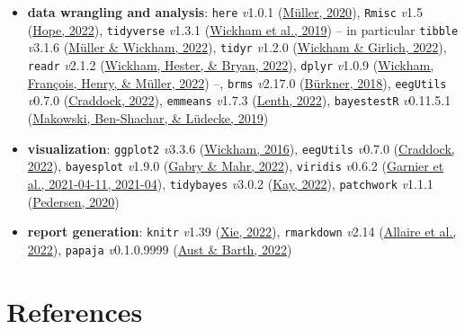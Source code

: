 \documentclass[
  man,floatsintext]{apa6}
\begin{document}
\begin{itemize}
\item
  \textbf{data wrangling and analysis}: \texttt{here} \emph{v}1.0.1 (\protect\hyperlink{ref-here}{Müller, 2020}), \texttt{Rmisc} \emph{v}1.5 (\protect\hyperlink{ref-Rmisc}{Hope, 2022}), \texttt{tidyverse} \emph{v}1.3.1 (\protect\hyperlink{ref-tidyverse}{Wickham et al., 2019}) -- in particular \texttt{tibble} \emph{v}3.1.6 (\protect\hyperlink{ref-tibble}{Müller \& Wickham, 2022}), \texttt{tidyr} \emph{v}1.2.0 (\protect\hyperlink{ref-tidyr}{Wickham \& Girlich, 2022}), \texttt{readr} \emph{v}2.1.2 (\protect\hyperlink{ref-readr}{Wickham, Hester, \& Bryan, 2022}), \texttt{dplyr} \emph{v}1.0.9 (\protect\hyperlink{ref-dplyr}{Wickham, François, Henry, \& Müller, 2022}) --, \texttt{brms} \emph{v}2.17.0 (\protect\hyperlink{ref-buxfcrkner2018}{Bürkner, 2018}), \texttt{eegUtils} \emph{v}0.7.0 (\protect\hyperlink{ref-eegUtils}{Craddock, 2022}), \texttt{emmeans} \emph{v}1.7.3 (\protect\hyperlink{ref-emmeans}{Lenth, 2022}), \texttt{bayestestR} \emph{v}0.11.5.1 (\protect\hyperlink{ref-bayestestR}{Makowski, Ben-Shachar, \& Lüdecke, 2019})
\item
  \textbf{visualization}: \texttt{ggplot2} \emph{v}3.3.6 (\protect\hyperlink{ref-ggplot2}{Wickham, 2016}), \texttt{eegUtils} \emph{v}0.7.0 (\protect\hyperlink{ref-eegUtils}{Craddock, 2022}), \texttt{bayesplot} \emph{v}1.9.0 (\protect\hyperlink{ref-bayesplot}{Gabry \& Mahr, 2022}), \texttt{viridis} \emph{v}0.6.2 (\protect\hyperlink{ref-garnier2021}{Garnier et al., 2021-04-11, 2021-04}), \texttt{tidybayes} \emph{v}3.0.2 (\protect\hyperlink{ref-tidybayes}{Kay, 2022}), \texttt{patchwork} \emph{v}1.1.1 (\protect\hyperlink{ref-patchwork}{Pedersen, 2020})
\item
  \textbf{report generation}: \texttt{knitr} \emph{v}1.39 (\protect\hyperlink{ref-knitr}{Xie, 2022}), \texttt{rmarkdown} \emph{v}2.14 (\protect\hyperlink{ref-rmarkdown}{Allaire et al., 2022}), \texttt{papaja} \emph{v}0.1.0.9999 (\protect\hyperlink{ref-papaja}{Aust \& Barth, 2022})
\end{itemize}

\newpage

\hypertarget{references}{%
\section{References}\label{references}}
\end{document}
